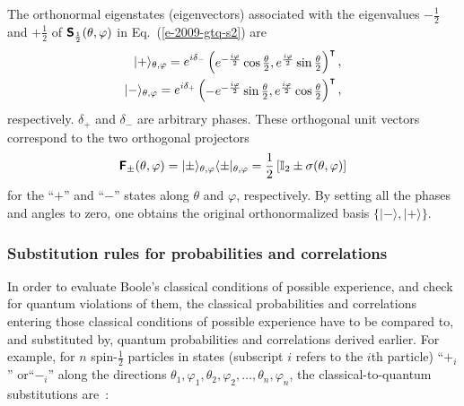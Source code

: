 \documentclass[%
  twocolumn,
 showpacs,
 showkeys,
 preprintnumbers,
 amsmath,amssymb,
 aps,
  pra,
  longbibliography,
 floatfix,
 ]{revtex4-1}
\begin{document}
The  orthonormal eigenstates (eigenvectors)  associated with the eigenvalues $-\frac{1}{2}$ and $+\frac{1}{2}$ of
$\textsf{\textbf{S}}_\frac{1}{2}(\theta , \varphi )$ in Eq.~(\ref{e-2009-gtq-s2})
are
\begin{equation}
\label{e-2009-gtq-s2ev}
\begin{split}
\vert +\rangle_{\theta ,\varphi}
=e^{i\delta_{-}} \begin{pmatrix}
e^{-\frac{i\varphi}{2}} \cos{\theta \over 2}, e^{\frac{i\varphi}{2}}\sin{\theta \over 2}
\end{pmatrix}^\intercal ,   \\
\vert -\rangle_{\theta ,\varphi}
=e^{i\delta_{+}}  \begin{pmatrix} -
e^{-\frac{i\varphi}{2}} \sin{\theta \over 2} ,e^{\frac{i\varphi}{2}}  \cos{\theta \over 2}
\end{pmatrix}^\intercal ,
\end{split}
\end{equation}
respectively. $\delta_{+}$ and $\delta_{-}$ are arbitrary phases.
These orthogonal unit vectors correspond to the two orthogonal projectors
\begin{equation}
\label{e-2009-gtq-s2evproj}
\textsf{\textbf{F}}_\pm (\theta ,\varphi ) =  \vert \pm \rangle_{\theta ,\varphi} \langle  \pm \vert_{\theta ,\varphi}
=
\frac{1}{2}
\left[
{\Bbb I}_2 \pm \sigma (\theta ,\varphi)
\right]
\end{equation}
for the ``$+$''   and ``$-$'' states along $\theta $ and $\varphi$, respectively.
By setting all the phases and angles to zero, one obtains the original
orthonormalized basis $\{\vert -\rangle,\vert +\rangle\}$.

\subsubsection{Substitution rules for probabilities and correlations}

In order to evaluate Boole's
classical conditions of possible
experience, and check for quantum violations of them,
the classical probabilities and correlations entering those classical conditions of possible
experience
have to be compared to, and substituted by,
quantum probabilities and correlations derived earlier.
For example, for $n$ spin-$\frac{1}{2}$ particles
in states (subscript $i$ refers to the $i$th particle) ``$+_i$'' or``$-_i$'' along the  directions
$\theta_{1},\varphi_{1} , \theta_{2},\varphi_{2} , \ldots ,\theta_n,\varphi_n$,
the classical-to-quantum substitutions are~\cite{filipp-svo-04-qpoly-prl,schimpf-svozil,svozil-2009-bogoliubov09-b}:
\end{document}
